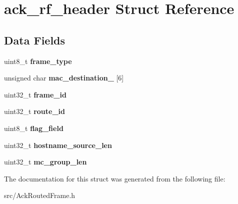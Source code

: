 \hypertarget{structack__rf__header}{\section{ack\-\_\-rf\-\_\-header Struct Reference}
\label{structack__rf__header}
}
\subsection*{Data Fields}
\begin{DoxyCompactItemize}
\item 
\hypertarget{structack__rf__header_a8922f626b1cc2c00818173b6f0ca10e9}{uint8\-\_\-t {\bfseries frame\-\_\-type}}\label{structack__rf__header_a8922f626b1cc2c00818173b6f0ca10e9}

\item 
\hypertarget{structack__rf__header_a4eaa4aaac4f84d10792c817efd5c96f8}{unsigned char {\bfseries mac\-\_\-destination\-\_\-} \mbox{[}6\mbox{]}}\label{structack__rf__header_a4eaa4aaac4f84d10792c817efd5c96f8}

\item 
\hypertarget{structack__rf__header_aee851335668e469b0d9223e3f500f861}{uint32\-\_\-t {\bfseries frame\-\_\-id}}\label{structack__rf__header_aee851335668e469b0d9223e3f500f861}

\item 
\hypertarget{structack__rf__header_a7a8a56154e7656aba02f98170c3195bc}{uint32\-\_\-t {\bfseries route\-\_\-id}}\label{structack__rf__header_a7a8a56154e7656aba02f98170c3195bc}

\item 
\hypertarget{structack__rf__header_ae387a253f9ec8cfc41efae375eee415c}{uint8\-\_\-t {\bfseries flag\-\_\-field}}\label{structack__rf__header_ae387a253f9ec8cfc41efae375eee415c}

\item 
\hypertarget{structack__rf__header_a98d61dbb8d9be735fbc46fc8a90880d2}{uint32\-\_\-t {\bfseries hostname\-\_\-source\-\_\-len}}\label{structack__rf__header_a98d61dbb8d9be735fbc46fc8a90880d2}

\item 
\hypertarget{structack__rf__header_a678665b28262b3fa620e8b6f10d377e3}{uint32\-\_\-t {\bfseries mc\-\_\-group\-\_\-len}}\label{structack__rf__header_a678665b28262b3fa620e8b6f10d377e3}

\end{DoxyCompactItemize}


The documentation for this struct was generated from the following file\-:\begin{DoxyCompactItemize}
\item 
src/Ack\-Routed\-Frame.\-h\end{DoxyCompactItemize}
